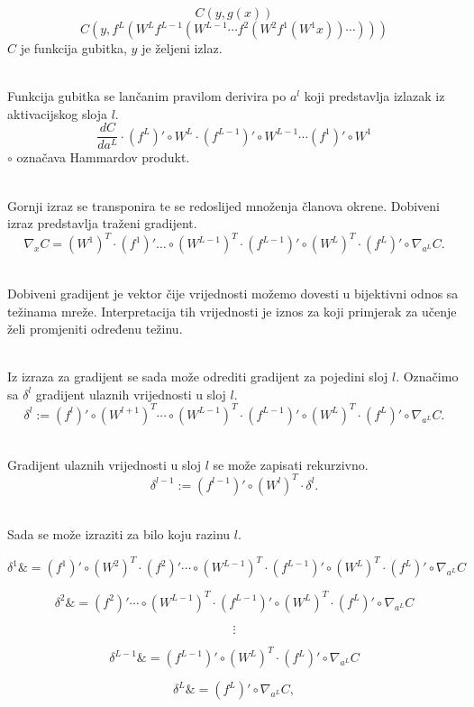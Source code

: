 	\[C(y,g(x))\]
	\[C(y,f^{L}(W^{L}f^{L-1}(W^{L-1}\cdots f^{2}(W^{2}f^{1}(W^{1}x))\cdots )))\]
	\(C\) je funkcija gubitka, \(y\) je željeni izlaz.
	
	\noindent\\Funkcija gubitka se lančanim pravilom derivira po \(a^l\) koji predstavlja izlazak iz aktivacijskog sloja \(l\).
	\[{\frac {dC}{da^{L}}}\cdot (f^{L})'\circ W^{L}\cdot (f^{L-1})'\circ W^{L-1}\cdots (f^{1})'\circ W^{1}\]
	\(\circ\) označava Hammardov produkt.
	
	\noindent\\Gornji izraz se transponira te se redoslijed množenja članova okrene. Dobiveni izraz predstavlja traženi gradijent.
	\[\nabla _{x}C=(W^{1})^{T}\cdot (f^{1})'\ldots \circ (W^{L-1})^{T}\cdot (f^{L-1})'\circ (W^{L})^{T}\cdot (f^{L})'\circ \nabla _{a^{L}}C.\]
	
	\noindent\\Dobiveni gradijent je vektor čije vrijednosti možemo dovesti u bijektivni odnos sa težinama mreže. Interpretacija tih vrijednosti je iznos za koji primjerak za učenje želi promjeniti određenu težinu.
	
	\noindent\\Iz izraza za gradijent se sada može odrediti gradijent za pojedini sloj \(l\). Označimo sa \(\delta ^{l}\) gradijent ulaznih vrijednosti u sloj \(l\). 
	\[\delta ^{l}:=(f^{l})'\circ (W^{l+1})^{T}\cdots \circ (W^{L-1})^{T}\cdot (f^{L-1})'\circ (W^{L})^{T}\cdot (f^{L})'\circ \nabla _{a^{L}}C.\]
	
	\noindent\\Gradijent ulaznih vrijednosti u sloj \(l\) se može zapisati rekurzivno.
	\[\delta ^{l-1}:=(f^{l-1})'\circ (W^{l})^{T}\cdot \delta ^{l}.\]
	
	\noindent\\Sada se može izraziti za bilo koju razinu \(l\).
	
	$$\delta ^{1}\&=(f^{1})'\circ (W^{2})^{T}\cdot (f^{2})'\cdots \circ (W^{L-1})^{T}\cdot (f^{L-1})'\circ (W^{L})^{T}\cdot (f^{L})'\circ \nabla _{a^{L}}C$$
					
				$$\delta ^{2}\&=(f^{2})'\cdots \circ (W^{L-1})^{T}\cdot (f^{L-1})'\circ (W^{L})^{T}\cdot (f^{L})'\circ \nabla _{a^{L}}C$$
				
				$$\vdots$$ 
				
				$$\delta ^{L-1}\&=(f^{L-1})'\circ (W^{L})^{T}\cdot (f^{L})'\circ \nabla _{a^{L}}C$$
				
				$$\delta ^{L}\&=(f^{L})'\circ \nabla _{a^{L}}C,$$
		
